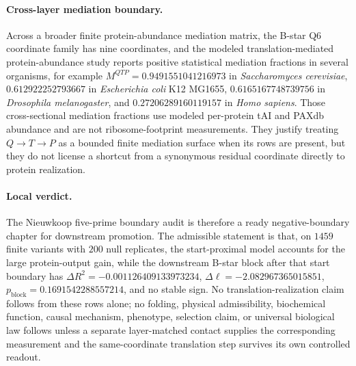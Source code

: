 \paragraph{Cross-layer mediation boundary.}
Across a broader finite protein-abundance mediation matrix, the B-star Q6 coordinate family has nine coordinates, and the modeled translation-mediated protein-abundance study reports positive statistical mediation fractions in several organisms, for example $M^{QTP}=0.9491551041216973$ in \emph{Saccharomyces cerevisiae}, $0.612922252793667$ in \emph{Escherichia coli} K12 MG1655, $0.6165167748739756$ in \emph{Drosophila melanogaster}, and $0.27206289160119157$ in \emph{Homo sapiens}.  Those cross-sectional mediation fractions use modeled per-protein tAI and PAXdb abundance and are not ribosome-footprint measurements.  They justify treating $Q \to T \to P$ as a bounded finite mediation surface when its rows are present, but they do not license a shortcut from a synonymous residual coordinate directly to protein realization.

\paragraph{Local verdict.}
The Nieuwkoop five-prime boundary audit is therefore a ready negative-boundary chapter for downstream promotion.  The admissible statement is that, on $1459$ finite variants with $200$ null replicates, the start-proximal model accounts for the large protein-output gain, while the downstream B-star block after that start boundary has $\Delta R^2=-0.001126409133973234$, $\Delta \ell=-2.082967365015851$, $p_{\mathrm{block}}=0.1691542288557214$, and no stable sign.  No translation-realization claim follows from these rows alone; no folding, physical admissibility, biochemical function, causal mechanism, phenotype, selection claim, or universal biological law follows unless a separate layer-matched contact supplies the corresponding measurement and the same-coordinate translation step survives its own controlled readout.